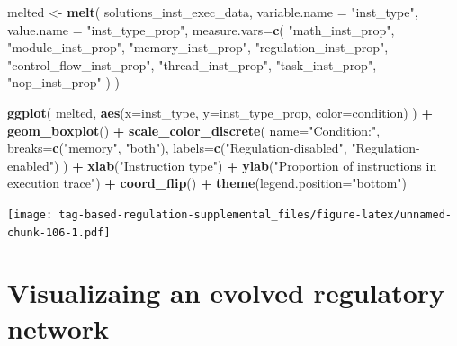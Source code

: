 \documentclass[
]{book}
\newenvironment{Shaded}{\begin{snugshade}}{\end{snugshade}}
\newcommand{\DataTypeTok}[1]{\textcolor[rgb]{0.13,0.29,0.53}{#1}}
\newcommand{\KeywordTok}[1]{\textcolor[rgb]{0.13,0.29,0.53}{\textbf{#1}}}
\newcommand{\NormalTok}[1]{#1}
\newcommand{\OperatorTok}[1]{\textcolor[rgb]{0.81,0.36,0.00}{\textbf{#1}}}
\newcommand{\StringTok}[1]{\textcolor[rgb]{0.31,0.60,0.02}{#1}}
\begin{document}
\begin{Shaded}
\begin{Highlighting}[]
\NormalTok{melted \textless{}{-}}\StringTok{ }\KeywordTok{melt}\NormalTok{(}
\NormalTok{  solutions\_inst\_exec\_data,}
  \DataTypeTok{variable.name =} \StringTok{"inst\_type"}\NormalTok{,}
  \DataTypeTok{value.name =} \StringTok{"inst\_type\_prop"}\NormalTok{,}
  \DataTypeTok{measure.vars=}\KeywordTok{c}\NormalTok{(}
    \StringTok{"math\_inst\_prop"}\NormalTok{,}
    \StringTok{"module\_inst\_prop"}\NormalTok{,}
    \StringTok{"memory\_inst\_prop"}\NormalTok{,}
    \StringTok{"regulation\_inst\_prop"}\NormalTok{,}
    \StringTok{"control\_flow\_inst\_prop"}\NormalTok{,}
    \StringTok{"thread\_inst\_prop"}\NormalTok{,}
    \StringTok{"task\_inst\_prop"}\NormalTok{,}
    \StringTok{"nop\_inst\_prop"}
\NormalTok{  )}
\NormalTok{)}

\KeywordTok{ggplot}\NormalTok{( melted, }\KeywordTok{aes}\NormalTok{(}\DataTypeTok{x=}\NormalTok{inst\_type, }\DataTypeTok{y=}\NormalTok{inst\_type\_prop, }\DataTypeTok{color=}\NormalTok{condition) ) }\OperatorTok{+}
\StringTok{  }\KeywordTok{geom\_boxplot}\NormalTok{() }\OperatorTok{+}
\StringTok{  }\KeywordTok{scale\_color\_discrete}\NormalTok{(}
    \DataTypeTok{name=}\StringTok{"Condition:"}\NormalTok{,}
    \DataTypeTok{breaks=}\KeywordTok{c}\NormalTok{(}\StringTok{"memory"}\NormalTok{, }\StringTok{"both"}\NormalTok{),}
    \DataTypeTok{labels=}\KeywordTok{c}\NormalTok{(}\StringTok{"Regulation{-}disabled"}\NormalTok{, }\StringTok{"Regulation{-}enabled"}\NormalTok{)}
\NormalTok{  ) }\OperatorTok{+}
\StringTok{  }\KeywordTok{xlab}\NormalTok{(}\StringTok{"Instruction type"}\NormalTok{) }\OperatorTok{+}
\StringTok{  }\KeywordTok{ylab}\NormalTok{(}\StringTok{"Proportion of instructions in execution trace"}\NormalTok{) }\OperatorTok{+}
\StringTok{  }\KeywordTok{coord\_flip}\NormalTok{() }\OperatorTok{+}
\StringTok{  }\KeywordTok{theme}\NormalTok{(}\DataTypeTok{legend.position=}\StringTok{"bottom"}\NormalTok{)}
\end{Highlighting}
\end{Shaded}

\texttt{[image: tag-based-regulation-supplemental\_files/figure-latex/unnamed-chunk-106-1.pdf]}

\hypertarget{visualizaing-an-evolved-regulatory-network-1}{%
\section{Visualizaing an evolved regulatory network}\label{visualizaing-an-evolved-regulatory-network-1}}
\end{document}
